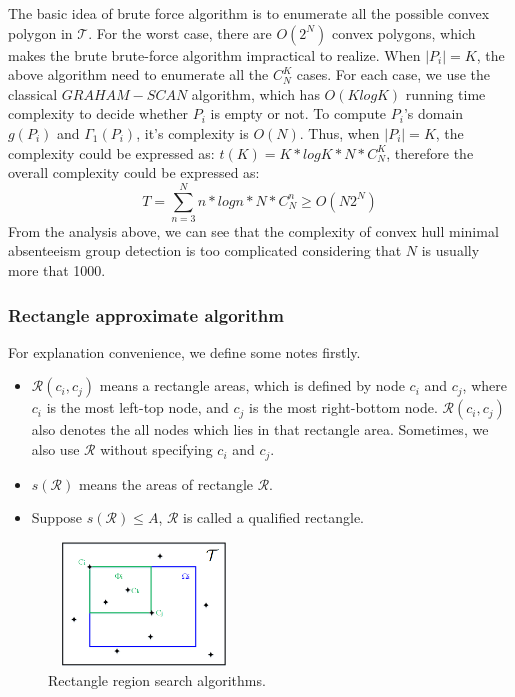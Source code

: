 The basic idea of brute force algorithm is to enumerate all the possible convex polygon in $\mathcal{T}$. For the worst case, there are $O(2^N)$ convex polygons, which makes the brute brute-force algorithm impractical to realize. When $|P_i|=K$, the above algorithm need to enumerate all the $C_N^K$ cases. For each case, we use the classical $GRAHAM-SCAN$ algorithm, which has $O(KlogK)$ running time complexity to decide whether $P_i$ is empty or not. To compute $P_i$'s domain $g(P_i)$ and $\Gamma_1(P_i)$, it's complexity is $O(N)$.
Thus, when $|P_i|=K$, the complexity could be expressed as: $t(K)=K*logK*N*C_N^K$, therefore the overall complexity could be expressed as:
\begin{equation} \label{e1.1}
T=\sum_{n=3}^Nn*logn*N*C_N^n\ge O(N2^N)
\end{equation}
From the analysis above, we can see that the complexity of convex hull minimal absenteeism group detection is too complicated considering that $N$ is usually more that 1000.

\subsubsection{Rectangle approximate algorithm}

For explanation convenience, we define some notes firstly.
\begin{itemize}
  \item $\mathcal{R}(c_i,c_j)$ means a rectangle areas, which is defined by node $c_i$ and $c_j$, where $c_i$ is the most left-top node, and $c_j$ is the most right-bottom node. $\mathcal{R}(c_i,c_j)$ also denotes the all nodes which lies in that rectangle area. Sometimes, we also use $\mathcal{R}$ without specifying $c_i$ and $c_j$.
    \item $s(\mathcal{R})$ means the areas of rectangle $\mathcal{R}$.
    \item Suppose $s(\mathcal{R})\leq A$, $\mathcal{R}$ is called a qualified rectangle.
\end{itemize}

\begin{figure}[t]
	\centering
	\includegraphics[width=2in,height=1.3in]{figures/algorithm.png}
	\caption{Rectangle region search algorithms.}
	\label{fig:rectangle_region}
\end{figure}

